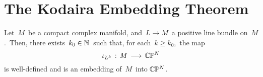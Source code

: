 

\section{The Kodaira Embedding Theorem}
\setcounter{theorem}{0}
\setcounter{equation}{0}


\renewcommand{\theenumi}{\roman{enumi}}
\renewcommand{\labelenumi}{\textnormal{(\theenumi)}$\;\;$}


\begin{theorem}
\mbox{}
\vskip 0.1cm
\noindent
Let \,$M$\, be a compact complex manifold,
and \,$L \longrightarrow M$\, a positive line bundle on \,$M$.\,
Then, there exists \,$k_{0} \in \mathbb{N}$\, such that, for each \,$k \geq k_{0}$,\,
the map
\begin{equation*}
\iota_{L^{k}} \, : \, M \, \longrightarrow \, \mathbb{C}\mathbb{P}^{N}
\end{equation*}
is well-defined and is an embedding of \,$M$\, into $\mathbb{C}\mathbb{P}^{N}$.
\end{theorem}


